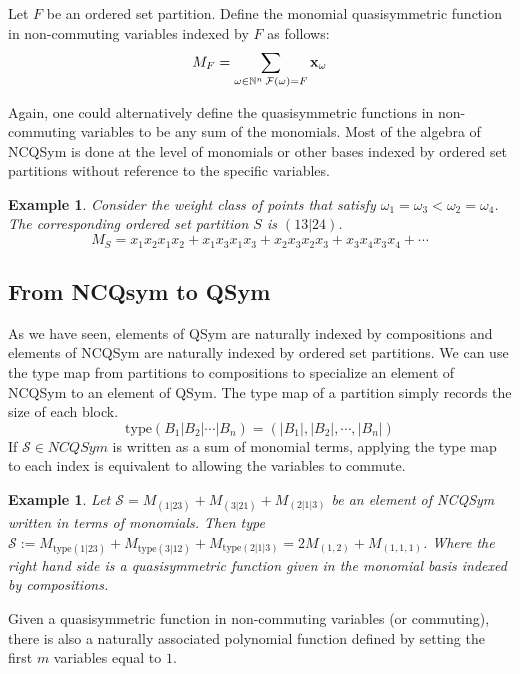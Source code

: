 \documentclass[12pt]{amsart}
\newtheorem{example}[definition]{Example}
\begin{document}
Let $F$ be an ordered set partition.  Define the monomial quasisymmetric function in non-commuting variables indexed by $F$ as follows:
$$M_F = \sum_{\omega \in \mathbb{N}^n \, \mathcal{F}(\omega) = F} {\bf{x}}_{\omega}$$

Again, one could alternatively define the quasisymmetric functions in
non-commuting variables to be any sum of the monomials.  Most of the
algebra of NCQSym is done at the level of monomials or other bases
indexed by ordered set partitions without reference to the specific
variables.  


\begin{example}

Consider the weight class of  points that satisfy $\omega_1 = \omega_3 < \omega_2 = \omega_4$.  The corresponding ordered set partition $S$ is $(13|24)$.  
$$M_S = x_1x_2x_1x_2 + x_1x_3x_1x_3 + x_2x_3x_2x_3 + x_3x_4x_3x_4 + \cdots$$  

\end{example}

\subsection{From NCQsym to QSym}

As we have seen, elements of QSym are naturally indexed by
compositions and elements of NCQSym are naturally indexed by ordered
set partitions.  We can use the type map from partitions to
compositions to specialize an element of NCQSym to an element of QSym.
The type map of a partition simply records the size of each block.
$$\textrm{type}(B_1|B_2|\cdots|B_n) = (|B_1|, |B_2|, \cdots, |B_n|)$$
If $\mathcal{S} \in NCQSym$ is written as a sum of monomial terms,
applying the type map to each index is equivalent to allowing the
variables to commute.

\begin{example}
Let $\mathcal{S} = M_{(1|23)} + M_{(3|21)} + M_{(2|1|3)}$ be an element of NCQSym written in terms of monomials.  Then 
{type} $\mathcal{S} :=  M_{\textrm{type} (1|23)} + M_{\textrm{type} (3|12)} + M_{\textrm{type} (2|1|3)} = 2 M_{(1,2)} + M_{(1,1,1)}$. Where the right hand side is a quasisymmetric function given in the monomial basis indexed by compositions.  
\end{example}



Given a quasisymmetric function in non-commuting variables (or
commuting), there is also a naturally associated polynomial function
defined by setting the first $m$ variables equal to $1$. 
\end{document}
